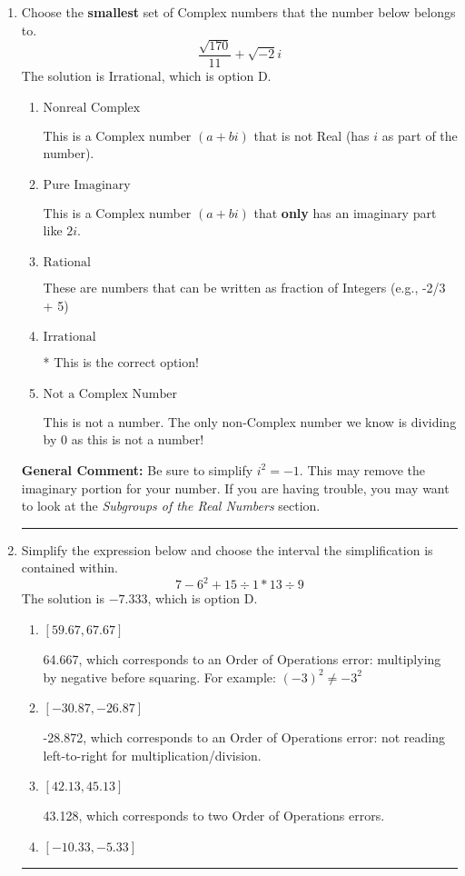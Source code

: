 \documentclass{extbook}[14pt]
\newcommand{\litem}[1]{\item #1

\rule{\textwidth}{0.4pt}}
\begin{document}
\begin{enumerate}
{ Irrational numbers are more than just square root of 3: adding or subtracting values from square root of 3 is also irrational.
}
\litem{
Choose the \textbf{smallest} set of Complex numbers that the number below belongs to.
\[ \frac{\sqrt{170}}{11}+\sqrt{-2}i \]
The solution is \( \text{Irrational} \), which is option D.\begin{enumerate}[label=\Alph*.]
\item \( \text{Nonreal Complex} \)

This is a Complex number $(a+bi)$ that is not Real (has $i$ as part of the number).
\item \( \text{Pure Imaginary} \)

This is a Complex number $(a+bi)$ that \textbf{only} has an imaginary part like $2i$.
\item \( \text{Rational} \)

These are numbers that can be written as fraction of Integers (e.g., -2/3 + 5)
\item \( \text{Irrational} \)

* This is the correct option!
\item \( \text{Not a Complex Number} \)

This is not a number. The only non-Complex number we know is dividing by 0 as this is not a number!
\end{enumerate}

\textbf{General Comment:} Be sure to simplify $i^2 = -1$. This may remove the imaginary portion for your number. If you are having trouble, you may want to look at the \textit{Subgroups of the Real Numbers} section.
}
\litem{
Simplify the expression below and choose the interval the simplification is contained within.
\[ 7 - 6^2 + 15 \div 1 * 13 \div 9 \]
The solution is \( -7.333 \), which is option D.\begin{enumerate}[label=\Alph*.]
\item \( [59.67, 67.67] \)

 64.667, which corresponds to an Order of Operations error: multiplying by negative before squaring. For example: $(-3)^2 \neq -3^2$
\item \( [-30.87, -26.87] \)

 -28.872, which corresponds to an Order of Operations error: not reading left-to-right for multiplication/division.
\item \( [42.13, 45.13] \)

 43.128, which corresponds to two Order of Operations errors.
\item \( [-10.33, -5.33] \)


\end{enumerate}}
\end{enumerate}
\end{document}
